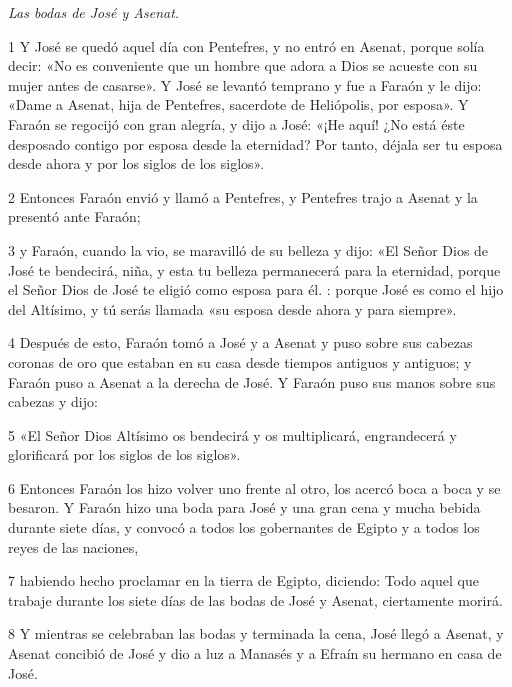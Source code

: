\par \textit{Las bodas de José y Asenat.}

\par 1 Y José se quedó aquel día con Pentefres, y no entró en Asenat, porque solía decir: «No es conveniente que un hombre que adora a Dios se acueste con su mujer antes de casarse». Y José se levantó temprano y fue a Faraón y le dijo: «Dame a Asenat, hija de Pentefres, sacerdote de Heliópolis, por esposa». Y Faraón se regocijó con gran alegría, y dijo a José: «¡He aquí! ¿No está éste desposado contigo por esposa desde la eternidad? Por tanto, déjala ser tu esposa desde ahora y por los siglos de los siglos».

\par 2 Entonces Faraón envió y llamó a Pentefres, y Pentefres trajo a Asenat y la presentó ante Faraón;

\par 3 y Faraón, cuando la vio, se maravilló de su belleza y dijo: «El Señor Dios de José te bendecirá, niña, y esta tu belleza permanecerá para la eternidad, porque el Señor Dios de José te eligió como esposa para él. : porque José es como el hijo del Altísimo, y tú serás llamada «su esposa desde ahora y para siempre».

\par 4 Después de esto, Faraón tomó a José y a Asenat y puso sobre sus cabezas coronas de oro que estaban en su casa desde tiempos antiguos y antiguos; y Faraón puso a Asenat a la derecha de José. Y Faraón puso sus manos sobre sus cabezas y dijo:

\par 5 «El Señor Dios Altísimo os bendecirá y os multiplicará, engrandecerá y glorificará por los siglos de los siglos».

\par 6 Entonces Faraón los hizo volver uno frente al otro, los acercó boca a boca y se besaron. Y Faraón hizo una boda para José y una gran cena y mucha bebida durante siete días, y convocó a todos los gobernantes de Egipto y a todos los reyes de las naciones,

\par 7 habiendo hecho proclamar en la tierra de Egipto, diciendo: Todo aquel que trabaje durante los siete días de las bodas de José y Asenat, ciertamente morirá.

\par 8 Y mientras se celebraban las bodas y terminada la cena, José llegó a Asenat, y Asenat concibió de José y dio a luz a Manasés y a Efraín su hermano en casa de José.

